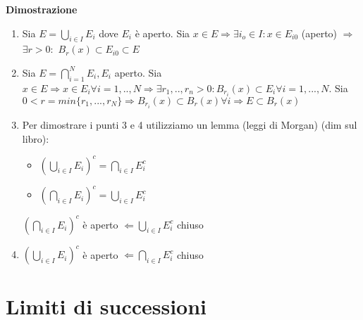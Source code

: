 \documentclass{article}
\begin{document}
\textbf{Dimostrazione}\\
\begin{enumerate}
    \item Sia $E=\bigcup_{i\in I}E_i$ dove $E_i$ è aperto. Sia $x\in E\Rightarrow \exists i_o\in I: x\in E_{i0}$ (aperto) $\Rightarrow$ $\exists r>0:$ $B_r(x)\subset E_{i0}\subset E$
    \item Sia $E=\bigcap_{i=1}^N E_i, E_i$ aperto. Sia $x\in E\Rightarrow x\in E_i \forall i=1,..,N\Rightarrow\exists r_1,..,r_n>0: B_{r_i}(x)\subset E_i \forall i=1,...,N$. Sia $0<r=min\{r_1,...,r_N\} \Rightarrow B_{r_i}(x)\subset B_r(x) \forall i \Rightarrow E\subset B_r(x)$
    \item Per dimostrare i punti 3 e 4 utilizziamo un lemma (leggi di Morgan) (dim sul libro): \begin{itemize}
        \item $\left(\bigcup_{i\in I} E_i\right)^c=\bigcap_{i\in I}E_i^c$
        \item $\left(\bigcap_{i\in I} E_i\right)^c=\bigcup_{i\in I}E_i^c$
    \end{itemize}
    $\left(\bigcap_{i\in I} E_i\right)^c$ è aperto $\Leftarrow \bigcup_{i\in I}E_i^c$ chiuso
    \item $\left(\bigcup_{i\in I} E_i\right)^c$ è aperto $\Leftarrow \bigcap_{i\in I}E_i^c$ chiuso
\end{enumerate}

\section{Limiti di successioni}
\end{document}
